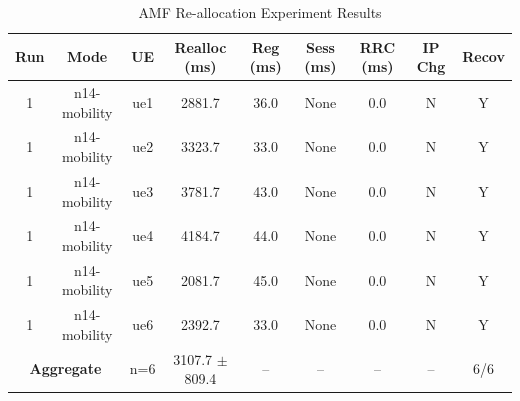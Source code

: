 \begin{table}[ht]
\centering
\begin{tabular}{|c|c|c|c|c|c|c|c|c|}
\hline
Run & Mode & UE & Realloc (ms) & Reg (ms) & Sess (ms) & RRC (ms) & IP Chg & Recov \\
\hline
1 & n14-mobility & ue1 & 2881.7 & 36.0 & None & 0.0 & N & Y \\
1 & n14-mobility & ue2 & 3323.7 & 33.0 & None & 0.0 & N & Y \\
1 & n14-mobility & ue3 & 3781.7 & 43.0 & None & 0.0 & N & Y \\
1 & n14-mobility & ue4 & 4184.7 & 44.0 & None & 0.0 & N & Y \\
1 & n14-mobility & ue5 & 2081.7 & 45.0 & None & 0.0 & N & Y \\
1 & n14-mobility & ue6 & 2392.7 & 33.0 & None & 0.0 & N & Y \\
\multicolumn{2}{|c|}{\textbf{Aggregate}} & n=6 & 3107.7 $\pm$ 809.4 & -- & -- & -- & -- & 6/6 \\
\hline
\end{tabular}
\caption{AMF Re-allocation Experiment Results}
\label{tab:amf_realloc}
\end{table}
